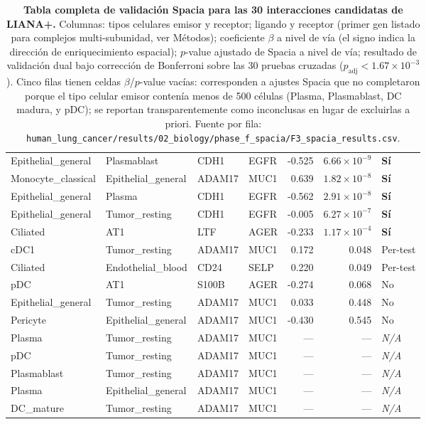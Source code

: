 \documentclass[12pt,a4paper]{article}
\begin{document}
\begin{table}[h!]
\begin{tabular}{@{}llllrrl@{}}
Epithelial\_general & Plasmablast & CDH1 & EGFR & -0.525 & $6.66{\times}10^{-9}$ & \textbf{Sí} \\
Monocyte\_classical & Epithelial\_general & ADAM17 & MUC1 & 0.639 & $1.82{\times}10^{-8}$ & \textbf{Sí} \\
Epithelial\_general & Plasma & CDH1 & EGFR & -0.562 & $2.91{\times}10^{-8}$ & \textbf{Sí} \\
Epithelial\_general & Tumor\_resting & CDH1 & EGFR & -0.005 & $6.27{\times}10^{-7}$ & \textbf{Sí} \\
Ciliated & AT1 & LTF & AGER & -0.233 & $1.17{\times}10^{-4}$ & \textbf{Sí} \\
cDC1 & Tumor\_resting & ADAM17 & MUC1 & 0.172 & 0.048 & Per-test \\
Ciliated & Endothelial\_blood & CD24 & SELP & 0.220 & 0.049 & Per-test \\
pDC & AT1 & S100B & AGER & -0.274 & 0.068 & No \\
Epithelial\_general & Tumor\_resting & ADAM17 & MUC1 & 0.033 & 0.448 & No \\
Pericyte & Epithelial\_general & ADAM17 & MUC1 & -0.430 & 0.545 & No \\
Plasma & Tumor\_resting & ADAM17 & MUC1 & --- & --- & \textit{N/A} \\
pDC & Tumor\_resting & ADAM17 & MUC1 & --- & --- & \textit{N/A} \\
Plasmablast & Tumor\_resting & ADAM17 & MUC1 & --- & --- & \textit{N/A} \\
Plasma & Epithelial\_general & ADAM17 & MUC1 & --- & --- & \textit{N/A} \\
DC\_mature & Tumor\_resting & ADAM17 & MUC1 & --- & --- & \textit{N/A} \\
\bottomrule
\end{tabular}
\caption{\textbf{Tabla completa de validación Spacia para las 30 interacciones candidatas de LIANA+.} Columnas: tipos celulares emisor y receptor; ligando y receptor (primer gen listado para complejos multi-subunidad, ver Métodos); coeficiente $\beta$ a nivel de vía (el signo indica la dirección de enriquecimiento espacial); $p$-value ajustado de Spacia a nivel de vía; resultado de validación dual bajo corrección de Bonferroni sobre las 30 pruebas cruzadas ($p_{\text{adj}} < 1.67 \times 10^{-3}$). Cinco filas tienen celdas $\beta$/$p$-value vacías: corresponden a ajustes Spacia que no completaron porque el tipo celular emisor contenía menos de 500 células (Plasma, Plasmablast, DC madura, y pDC); se reportan transparentemente como inconclusas en lugar de excluirlas a priori. Fuente por fila: \texttt{human\_lung\_cancer/results/02\_biology/phase\_f\_spacia/F3\_spacia\_results.csv}.}
\label{tab:s4}
\end{table}
\end{document}
